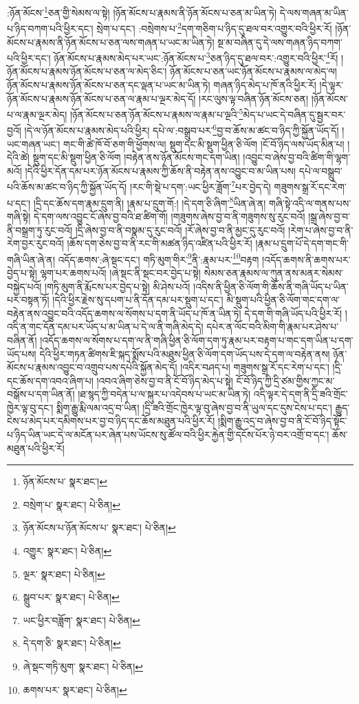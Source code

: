 :ཉོན་མོངས་\footnote{ཉོན་མོངས་པ་  སྣར་ཐང་། }ཅན་གྱི་སེམས་ལ་སྟེ། །ཉོན་མོངས་པ་རྣམས་ནི་ཉོན་མོངས་པ་ཅན་མ་ཡིན་ཏེ། དེ་ལས་གཞན་མ་ཡིན་པ་ཉིད་བཀག་པའི་ཕྱིར་དང་། སྲེག་པ་དང་། :བསྲེགས་པ་\footnote{བསྲེག་པ་  སྣར་ཐང་།  པེ་ཅིན། }དག་གཅིག་པ་ཉིད་དུ་ཐལ་བར་འགྱུར་བའི་ཕྱིར་རོ། །ཉོན་མོངས་པ་རྣམས་ནི་ཉོན་མོངས་པ་ཅན་ལས་གཞན་པ་ཡང་མ་ཡིན་ཏེ། སྔ་མ་བཞིན་དུ་དེ་ལས་གཞན་ཉིད་བཀག་པའི་ཕྱིར་དང་། ཉོན་མོངས་པ་རྣམས་མེད་པར་ཡང་:ཉོན་མོངས་པ་\footnote{ཉོན་མོངས་པ་ཉོན་མོངས་པ་  སྣར་ཐང་།  པེ་ཅིན། }ཅན་ཉིད་དུ་ཐལ་བར་:འགྱུར་བའི་ཕྱིར་\footnote{འགྱུར་  སྣར་ཐང་།  པེ་ཅིན། }རོ། །ཉོན་མོངས་པ་རྣམས་ཉོན་མོངས་པ་ཅན་ལ་མེད་ཅིང་། ཉོན་མོངས་པ་ཅན་ཡང་ཉོན་མོངས་པ་རྣམས་ལ་མེད་ལ། ཉོན་མོངས་པ་རྣམས་ཉོན་མོངས་པ་ཅན་དང་ལྡན་པ་ཡང་མ་ཡིན་ཏེ། གཞན་ཉིད་མེད་པ་ཁོ་ནའི་ཕྱིར་རོ། །དེ་ལྟར་ཉོན་མོངས་པ་རྣམས་ཉོན་མོངས་པ་ཅན་ལ་རྣམ་པ་ལྔར་མེད་དོ། །རང་ལུས་ལྟ་བཞིན་ཉོན་མོངས་ཅན། །ཉོན་མོངས་པ་ལ་རྣམ་ལྔར་མེད། །ཉོན་མོངས་པ་ཅན་ཉོན་མོངས་པ་རྣམས་ལ་རྣམ་པ་ལྔའི་\footnote{ལྔར་  སྣར་ཐང་།  པེ་ཅིན། }མེད་པ་ཡང་དེ་བཞིན་དུ་སྦྱར་བར་བྱའོ། །དེ་ལ་ཉོན་མོངས་པ་རྣམས་མེད་པའི་ཕྱིར། དཔེ་ལ་:བསྒྲུབ་པར་\footnote{སྒྲུབ་པར་  སྣར་ཐང་།  པེ་ཅིན། }བྱ་བ་ཆོས་མ་ཚང་བ་ཉིད་ཀྱི་སྐྱོན་ཡོད་དོ། །ཡང་གཞན་ཡང་། གང་གི་ཚེ་ཁོ་བོ་ཅག་གི་ཕྱོགས་ལ། སྡུག་དང་མི་སྡུག་ཕྱིན་ཅི་ལོག །ངོ་བོ་ཉིད་ལས་ཡོད་མིན་པ། །དེའི་ཚེ། སྡུག་དང་མི་སྡུག་ཕྱིན་ཅི་ལོག །བརྟེན་ནས་ཉོན་མོངས་གང་དག་ཡིན། །འབྱུང་བ་ཞེས་བྱ་བའི་ཚིག་གི་ལྷག་མའོ། །དེའི་ཕྱིར་དོན་དམ་པར་ཉོན་མོངས་པ་རྣམས་ཀྱི་ཆོས་ནི་བརྟེན་ནས་འབྱུང་བ་མ་ཡིན་པས། དཔེ་ལ་བསྒྲུབ་པའི་ཆོས་མ་ཚང་བ་ཉིད་ཀྱི་སྐྱོན་ཡོད་དོ། །རང་གི་སྡེ་པ་དག་:ཡང་ཕྱིར་ཟློག་\footnote{ཡང་ཕྱིར་བཟློག་  སྣར་ཐང་།  པེ་ཅིན། }པར་བྱེད་དེ། གཟུགས་སྒྲ་རོ་དང་རེག་པ་དང་། །དྲི་དང་ཆོས་དག་རྣམ་དྲུག་ནི། །རྣམ་པ་དྲུག་གོ:། །དེ་དག་ཅི་ཞིག་\footnote{དེ་དག་ཅི་  སྣར་ཐང་།  པེ་ཅིན། }ཡིན་ཞེ་ན། གཞི་སྟེ་འདི་ལ་གནས་པས་གཞི་སྟེ། དེ་དག་ལས་འབྱུང་ངོ་ཞེས་བྱ་བའི་ཐ་ཚིག་གོ། །གཟུགས་ཞེས་བྱ་བ་ནི་གཟུགས་སུ་རུང་བའོ། །སྒྲ་ཞེས་བྱ་བ་ནི་བསྒྲག་ཏུ་རུང་བའོ། །དྲི་ཞེས་བྱ་བ་ནི་བསྣམ་དུ་རུང་བའོ། །རོ་ཞེས་བྱ་བ་ནི་མྱང་དུ་རུང་བའོ། །རེག་པ་ཞེས་བྱ་བ་ནི་རེག་བྱར་རུང་བའོ། །ཆོས་དག་ཅེས་བྱ་བ་ནི་རང་གི་མཚན་ཉིད་འཛིན་པའི་ཕྱིར་རོ། །རྣམ་པ་དྲུག་པོ་དེ་དག་གང་གི་གཞི་ཡིན་ཞེ་ན། འདོད་ཆགས་:ཞེ་སྡང་དང་། གཏི་མུག་གིར་\footnote{ཞེ་སྡང་གཏི་མུག་  སྣར་ཐང་།  པེ་ཅིན། }ནི་:རྣམ་པར་\footnote{ཆགས་པར་  སྣར་ཐང་།  པེ་ཅིན། }བརྟག །འདོད་ཆགས་ནི་ཆགས་པར་བྱེད་པ་སྟེ། ལྷག་པར་ཆགས་པའོ། །ཞེ་སྡང་ནི་སྡང་བར་བྱེད་པ་སྟེ། སེམས་ཅན་རྣམས་ལ་ཀུན་ནས་མནར་སེམས་བསྐྱེད་པའོ། །གཏི་མུག་ནི་རྨོངས་པར་བྱེད་པ་སྟེ། མི་ཤེས་པའོ། །འདིས་ནི་ཕྱིན་ཅི་ལོག་གི་ཆོས་ནི་གཞི་ཡོད་པ་ཡིན་པར་བསྟན་ཏོ། །དེའི་ཕྱིར་རྗེས་སུ་དཔག་པ་ནི་དོན་དམ་པར་སྡུག་པ་དང་། མི་སྡུག་པའི་ཕྱིན་ཅི་ལོག་གང་དག་ལ་བརྟེན་ནས་འབྱུང་བའི་འདོད་ཆགས་ལ་སོགས་པ་དག་ནི་ཡོད་པ་ཁོ་ན་ཡིན་ཏེ། དེ་དག་གི་གཞི་ཡོད་པའི་ཕྱིར་རོ། །འདི་ན་གང་དོན་དམ་པར་ཡོད་པ་མ་ཡིན་པ་དེ་ལ་ནི་གཞི་མེད་དེ། དཔེར་ན་ལོང་བའི་མིག་གི་རྣམ་པར་ཤེས་པ་བཞིན་ནོ། །འདོད་ཆགས་ལ་སོགས་པ་དག་ལ་ནི་གཞི་ཕྱིན་ཅི་ལོག་དག་ཏུ་རྣམ་པར་བརྟག་པ་གང་དག་ཡིན་པ་དག་ཡོད་པས། དེའི་ཕྱིར་གཏན་ཚིགས་ཇི་སྐད་སྨོས་པའི་མཐུས་ཕྱིན་ཅི་ལོག་དག་ཡོད་པས་དེ་དག་ལ་བརྟེན་ནས། ཉོན་མོངས་པ་རྣམས་འབྱུང་བ་འགྲུབ་པས་དཔེའི་སྐྱོན་མེད་དོ། །འདིར་བཤད་པ། གཟུགས་སྒྲ་རོ་དང་རེག་པ་དང་། །དྲི་དང་ཆོས་དག་འབའ་ཞིག་པ། །འབའ་ཞིག་ཅེས་བྱ་བ་ནི་ངོ་བོ་ཉིད་མེད་པ་སྟེ། ངོ་བོ་ཉིད་ཀྱི་དྲི་ཙམ་གྱིས་ཀྱང་མ་བསྒོས་པ་དག་ཡིན་ནོ། །ཐ་སྙད་ཀྱི་བདེན་པ་ལ་སྐུར་པ་འདེབས་པ་ཡང་མ་ཡིན་ཏེ། འདི་ལྟར་དེ་དག་ནི་དྲི་ཟའི་གྲོང་ཁྱེར་ལྟ་བུ་དང་། སྨིག་རྒྱུ་རྨི་ལམ་འདྲ་བ་ཡིན། །དྲི་ཟའི་གྲོང་ཁྱེར་ལྟ་བུ་ཞེས་བྱ་བ་ནི་ཡུལ་དང་དུས་ངེས་པ་དང་། རྒྱུད་ངེས་པ་མེད་པར་དམིགས་པར་བྱ་བ་ཉིད་དང་ཆོས་མཐུན་པའི་ཕྱིར་རོ། །སྨིག་རྒྱུ་འདྲ་བ་ཞེས་བྱ་བ་ནི་ངོ་བོ་ཉིད་སྟོང་པ་ཉིད་ཡིན་ཡང་དེ་ལ་མངོན་པར་ཞེན་པས་ཡོངས་སུ་ཚོལ་བའི་ཕྱིར་རྐྱེན་གྱི་དངོས་པོར་ཉེ་བར་འགྲོ་བ་དང་། ཆོས་མཐུན་པའི་ཕྱིར་རོ། 
